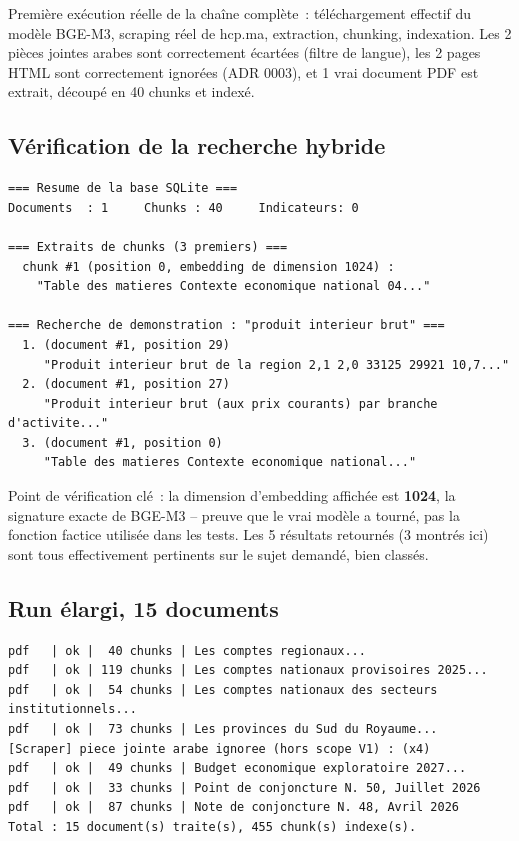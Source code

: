 \documentclass[11pt,a4paper]{article}
\begin{document}
Premi\`ere ex\'ecution r\'eelle de la cha\^ine compl\`ete~: t\'el\'echargement effectif du mod\`ele BGE-M3, scraping r\'eel de hcp.ma, extraction, chunking, indexation. Les 2 pi\`eces jointes arabes sont correctement \'ecart\'ees (filtre de langue), les 2 pages HTML sont correctement ignor\'ees (ADR 0003), et 1 vrai document PDF est extrait, d\'ecoup\'e en 40 chunks et index\'e.

\subsection{V\'erification de la recherche hybride}
\begin{terminal}[title={PS> python -m scripts.inspecter\_index --recherche "produit interieur brut"}]
\begin{Verbatim}
=== Resume de la base SQLite ===
Documents  : 1     Chunks : 40     Indicateurs: 0

=== Extraits de chunks (3 premiers) ===
  chunk #1 (position 0, embedding de dimension 1024) :
    "Table des matieres Contexte economique national 04..."

=== Recherche de demonstration : "produit interieur brut" ===
  1. (document #1, position 29)
     "Produit interieur brut de la region 2,1 2,0 33125 29921 10,7..."
  2. (document #1, position 27)
     "Produit interieur brut (aux prix courants) par branche d'activite..."
  3. (document #1, position 0)
     "Table des matieres Contexte economique national..."
\end{Verbatim}
\end{terminal}

Point de v\'erification cl\'e~: la dimension d'embedding affich\'ee est \textbf{1024}, la signature exacte de BGE-M3 -- preuve que le vrai mod\`ele a tourn\'e, pas la fonction factice utilis\'ee dans les tests. Les 5 r\'esultats retourn\'es (3 montr\'es ici) sont tous effectivement pertinents sur le sujet demand\'e, bien class\'es.

\subsection{Run \'elargi, 15 documents}
\begin{terminal}[title={PS> python -m scripts.indexer\_documents --limite 15}]
\begin{Verbatim}
pdf   | ok |  40 chunks | Les comptes regionaux...
pdf   | ok | 119 chunks | Les comptes nationaux provisoires 2025...
pdf   | ok |  54 chunks | Les comptes nationaux des secteurs institutionnels...
pdf   | ok |  73 chunks | Les provinces du Sud du Royaume...
[Scraper] piece jointe arabe ignoree (hors scope V1) : (x4)
pdf   | ok |  49 chunks | Budget economique exploratoire 2027...
pdf   | ok |  33 chunks | Point de conjoncture N. 50, Juillet 2026
pdf   | ok |  87 chunks | Note de conjoncture N. 48, Avril 2026
Total : 15 document(s) traite(s), 455 chunk(s) indexe(s).
\end{Verbatim}
\end{terminal}
\end{document}
